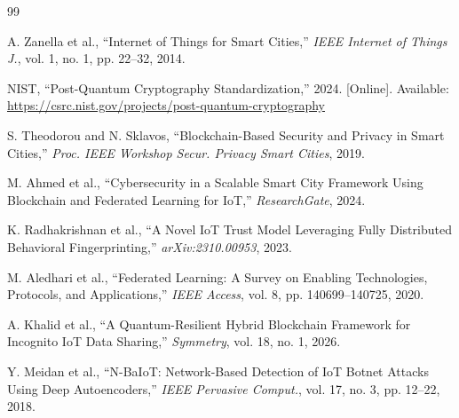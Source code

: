 \documentclass[journal]{IEEEtran}
\begin{document}
\begin{thebibliography}{99}

A. Zanella et al., ``Internet of Things for Smart Cities,''
\textit{IEEE Internet of Things J.}, vol. 1, no. 1, pp. 22--32, 2014.

NIST, ``Post-Quantum Cryptography Standardization,'' 2024.
[Online]. Available: \url{https://csrc.nist.gov/projects/post-quantum-cryptography}

S. Theodorou and N. Sklavos, ``Blockchain-Based Security and Privacy
in Smart Cities,'' \textit{Proc. IEEE Workshop Secur. Privacy Smart
Cities}, 2019.

M. Ahmed et al., ``Cybersecurity in a Scalable Smart City Framework
Using Blockchain and Federated Learning for IoT,''
\textit{ResearchGate}, 2024.

K. Radhakrishnan et al., ``A Novel IoT Trust Model Leveraging Fully
Distributed Behavioral Fingerprinting,'' \textit{arXiv:2310.00953}, 2023.

M. Aledhari et al., ``Federated Learning: A Survey on Enabling
Technologies, Protocols, and Applications,''
\textit{IEEE Access}, vol. 8, pp. 140699--140725, 2020.

A. Khalid et al., ``A Quantum-Resilient Hybrid Blockchain Framework
for Incognito IoT Data Sharing,''
\textit{Symmetry}, vol. 18, no. 1, 2026.

Y. Meidan et al., ``N-BaIoT: Network-Based Detection of IoT Botnet
Attacks Using Deep Autoencoders,''
\textit{IEEE Pervasive Comput.}, vol. 17, no. 3, pp. 12--22, 2018.

\end{thebibliography}
\end{document}
